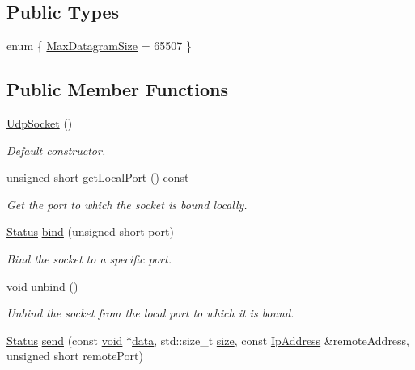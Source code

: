 \subsection*{Public Types}
\begin{DoxyCompactItemize}
\item 
enum \{ \hyperlink{classsf_1_1_udp_socket_acd0ca8dca28f171715078d01684ddd73a728a7d33027bee0d65f70f964dd9c9eb}{Max\-Datagram\-Size} = 65507
 \}
\end{DoxyCompactItemize}
\subsection*{Public Member Functions}
\begin{DoxyCompactItemize}
\item 
\hyperlink{classsf_1_1_udp_socket_abb10725e26dee9d3a8165fe87ffb71bb}{Udp\-Socket} ()
\begin{DoxyCompactList}\small\item\em Default constructor. \end{DoxyCompactList}\item 
unsigned short \hyperlink{classsf_1_1_udp_socket_a8ce625debd4b1f885366a69faa270086}{get\-Local\-Port} () const 
\begin{DoxyCompactList}\small\item\em Get the port to which the socket is bound locally. \end{DoxyCompactList}\item 
\hyperlink{classsf_1_1_socket_a51bf0fd51057b98a10fbb866246176dc}{Status} \hyperlink{classsf_1_1_udp_socket_ab0bf8d32849836f92beb2fd734565481}{bind} (unsigned short port)
\begin{DoxyCompactList}\small\item\em Bind the socket to a specific port. \end{DoxyCompactList}\item 
\hyperlink{glutf90_8h_ac778d6f63f1aaf8ebda0ce6ac821b56e}{void} \hyperlink{classsf_1_1_udp_socket_a2c4abb8102a1bd31f51fcfe7f15427a3}{unbind} ()
\begin{DoxyCompactList}\small\item\em Unbind the socket from the local port to which it is bound. \end{DoxyCompactList}\item 
\hyperlink{classsf_1_1_socket_a51bf0fd51057b98a10fbb866246176dc}{Status} \hyperlink{classsf_1_1_udp_socket_a664ab8f26f37c21cc4de1b847c2efcca}{send} (const \hyperlink{glutf90_8h_ac778d6f63f1aaf8ebda0ce6ac821b56e}{void} $\ast$\hyperlink{gl3_8h_a0f78eecb0891cce3bdfc815b971866a1}{data}, std\-::size\-\_\-t \hyperlink{gl3_8h_a79ef9eb3e59c4bb34c4b9fbeb8d28ff7}{size}, const \hyperlink{classsf_1_1_ip_address}{Ip\-Address} \&remote\-Address, unsigned short remote\-Port)

\end{DoxyCompactItemize}
